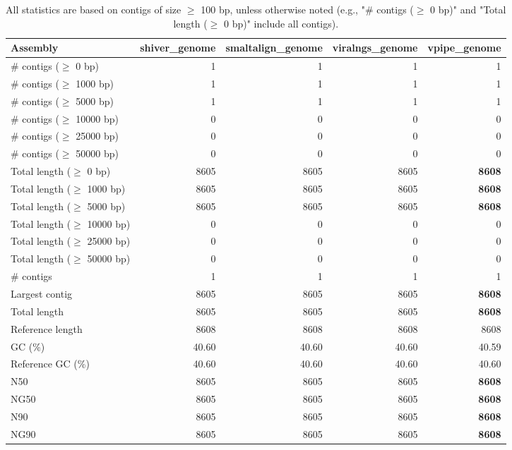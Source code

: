 \documentclass[12pt,a4paper]{article}
\begin{document}
\begin{table}[ht]
\begin{center}
\caption{All statistics are based on contigs of size $\geq$ 100 bp, unless otherwise noted (e.g., "\# contigs ($\geq$ 0 bp)" and "Total length ($\geq$ 0 bp)" include all contigs).}
\begin{tabular}{|l*{4}{|r}|}
\hline
Assembly & shiver\_genome & smaltalign\_genome & viralngs\_genome & vpipe\_genome \\ \hline
\# contigs ($\geq$ 0 bp) & 1 & 1 & 1 & 1 \\ \hline
\# contigs ($\geq$ 1000 bp) & 1 & 1 & 1 & 1 \\ \hline
\# contigs ($\geq$ 5000 bp) & 1 & 1 & 1 & 1 \\ \hline
\# contigs ($\geq$ 10000 bp) & 0 & 0 & 0 & 0 \\ \hline
\# contigs ($\geq$ 25000 bp) & 0 & 0 & 0 & 0 \\ \hline
\# contigs ($\geq$ 50000 bp) & 0 & 0 & 0 & 0 \\ \hline
Total length ($\geq$ 0 bp) & 8605 & 8605 & 8605 & {\bf 8608} \\ \hline
Total length ($\geq$ 1000 bp) & 8605 & 8605 & 8605 & {\bf 8608} \\ \hline
Total length ($\geq$ 5000 bp) & 8605 & 8605 & 8605 & {\bf 8608} \\ \hline
Total length ($\geq$ 10000 bp) & 0 & 0 & 0 & 0 \\ \hline
Total length ($\geq$ 25000 bp) & 0 & 0 & 0 & 0 \\ \hline
Total length ($\geq$ 50000 bp) & 0 & 0 & 0 & 0 \\ \hline
\# contigs & 1 & 1 & 1 & 1 \\ \hline
Largest contig & 8605 & 8605 & 8605 & {\bf 8608} \\ \hline
Total length & 8605 & 8605 & 8605 & {\bf 8608} \\ \hline
Reference length & 8608 & 8608 & 8608 & 8608 \\ \hline
GC (\%) & 40.60 & 40.60 & 40.60 & 40.59 \\ \hline
Reference GC (\%) & 40.60 & 40.60 & 40.60 & 40.60 \\ \hline
N50 & 8605 & 8605 & 8605 & {\bf 8608} \\ \hline
NG50 & 8605 & 8605 & 8605 & {\bf 8608} \\ \hline
N90 & 8605 & 8605 & 8605 & {\bf 8608} \\ \hline
NG90 & 8605 & 8605 & 8605 & {\bf 8608} \\ \hline

\end{tabular}
\end{center}
\end{table}
\end{document}
